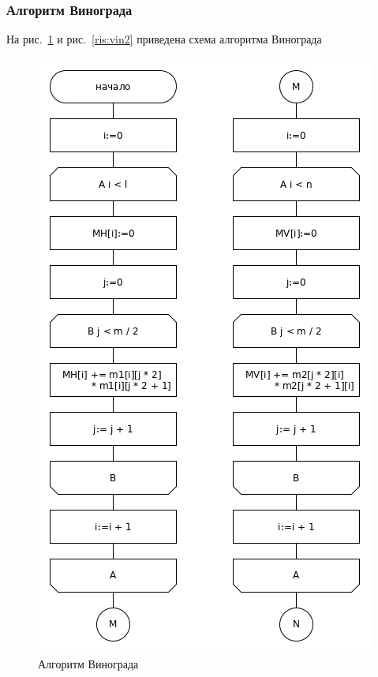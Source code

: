 \documentclass[a4paper,12pt]{article}
\begin{document}
    \subsubsection{Алгоритм Винограда}
    
    На рис.~\ref{ris:vin1} и рис.~\ref{ris:vin2} приведена схема алгоритма Винограда
	 		\begin{figure}[H]
	 			\centering
	 			{
	 				\includegraphics[scale=0.71]{vinograd1.png}
	 				\caption{\label{ris:vin1}Алгоритм Винограда}	
	 			}
	 		\end{figure}	
\end{document}
